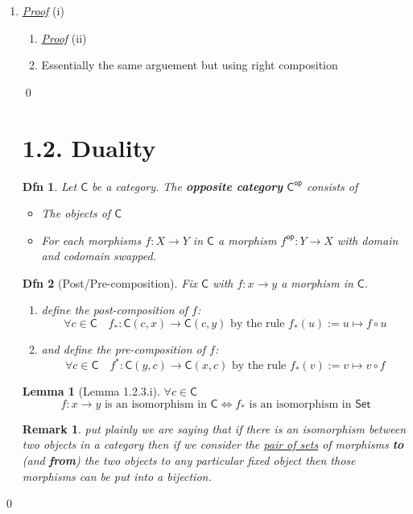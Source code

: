 \documentclass{article}
\theoremstyle{spacious}
\newtheorem*{dfn}{Dfn}
\newtheorem*{rmk}{Remark}
\newtheorem*{lem}{Lemma}
\newenvironment{pf}{\begin{enumerate} \item[] \textit{\underline{Proof}} }{\end{enumerate}\qed}
\renewcommand{\:}{\vcentcolon=} %
\begin{document}
\begin{pf}{(i)}
\begin{pf}{(ii)}
    \item[] Essentially the same arguement but using right composition
\end{pf}

\newpage

\section*{1.2. Duality}

\begin{dfn} Let \(\mathsf{C}\) be a category.  The \textbf{opposite category} \(\mathsf{C^{op}}\) consists of 
    \begin{itemize}
        \item The objects of \(\mathsf{C}\)
        \item For each morphisms $f:X \to Y$ in \(\mathsf{C}\) a morphism \(f^{\mathsf{op}}:Y \to X\) with domain and codomain swapped.
    \end{itemize}
\end{dfn}

\begin{dfn}[Post/Pre-composition] Fix \(\mathsf{C}\) with \(f:x \to y\) a morphism in \(\mathsf{C}\).
\begin{enumerate}
    \item define the post-composition of $f$:
    \[
        \forall c \in \mathsf{C} \quad f_*: \mathsf{C}(c,x) \to \mathsf{C}(c,y) \text{ by the rule } f_*(u):=u\mapsto f\circ u
    \]
    \item and define the pre-composition of $f$:
    \[
        \forall c \in \mathsf{C}\quad f^*: \mathsf{C}(y,c) \to \mathsf{C}(x,c) \text{ by the rule } f_*(v):=v\mapsto v\circ f
    \]
\end{enumerate}
\end{dfn}

\begin{lem}[Lemma 1.2.3.i] \(\forall c \in \mathsf{C}\)
    \[
        f:x\to y \text{ is an isomorphism in }\mathsf{C} \iff f_* \text{ is an isomorphism in \(\mathsf{Set}\)}
    \]
\end{lem}

\begin{rmk}
    \textit{put plainly we are saying that if there is an isomorphism between two objects in a category then if we consider the \underline{pair of sets} of morphisms \textbf{to} (and \textbf{from}) the two objects to any particular fixed object then those morphisms can be put into a bijection.}
\end{rmk}


\end{pf}
\end{document}
